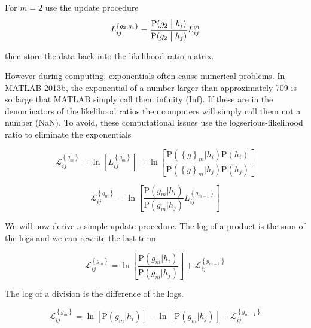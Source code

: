 For $m=2$ use the update procedure
\begin{equation}
    L_{ij}^{\left\{ g_2, g_1 \right\}} =
    {
        \mbox{P}( g_2 \bigm\vert {h}_i )
    \over
        \mbox{P}( g_2 \bigm\vert {h}_j )
    }
    L_{ij}^{g_1}
\end{equation}

\noindent then store the data back into the likelihood ratio matrix.

However during computing, exponentials often cause numerical problems. In MATLAB 2013b, the exponential of a number larger than approximately 709 is so large that MATLAB simply call them infinity (Inf). If these are in the denominators of the likelihood ratios then computers will simply call them not a number (NaN). To avoid, these computational issues use the logserious-likelihood ratio to eliminate the exponentials

\begin{equation}
    \mathscr{L}_{ij}^{\left\{g_m\right\}}
    =
    \ln{
        \left[
            L_{ij}^{\left\{g_m\right\}}
        \right]
    }
    =
    \ln{
    \left[
        \frac
        {
            \mbox{P}(\left\{ g \right\}_m|{h}_i)\mbox{P}({h}_i)
        }
        {
            \mbox{P}(\left\{ g \right\}_m|{h}_j)\mbox{P}({h}_j)
        }
    \right]
    }
\end{equation}

\begin{equation}
    \mathscr{L}_{ij}^{\left\{g_m\right\}}
    =
    \ln{
        \left[
            \frac
            {
                \mbox{P}( g_m |{h}_i)
            }
            {
                \mbox{P}( g_m |{h}_j)
            }
            L_{ij}^{\left\{g_{m-1}\right\}}
        \right]
    }
\end{equation}

We will now derive a simple update procedure. The log of a product is the sum of the logs and we can rewrite the last term:

\begin{equation}
    \mathscr{L}_{ij}^{\left\{g_m\right\}}
    =
    \ln{
        \left[
            \frac
            {
                \mbox{P}( g_m |{h}_i)
            }
            {
                \mbox{P}( g_m |{h}_j)
            }
        \right]
    }
    +
    \mathscr{L}_{ij}^{\left\{g_{m-1}\right\}}
\end{equation}

\noindent The log of a division is the difference of the logs.

\begin{equation}
    \mathscr{L}_{ij}^{\left\{g_m\right\}}
    =
    \ln{
        \left[
            \mbox{P}( g_m |{h}_i)
        \right]
    }
    -
    \ln{
        \left[
            \mbox{P}( g_m |{h}_j)
        \right]
    }
    +
    \mathscr{L}_{ij}^{\left\{g_{m-1}\right\}}
\end{equation}

